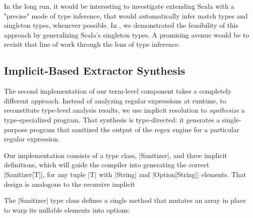 In the long run, it would be interesting to investigate extending Scala with a "precise" mode of type inference, that would automatically infer match types and singleton types, whenever possible.
In , we demonstrated the feasibility of this approach by generalizing Scala's singleton types.
A promising avenue would be to revisit that line of work through the lens of type inference.

\subsection{Implicit-Based Extractor Synthesis}
\label{subsec:implicit-based-extractor-synthesis}

The second implementation of our term-level component takes a completely different approach.
Instead of analyzing regular expressions at runtime, to reconstitute type-level analysis results, we use implicit resolution to \emph{synthesize} a type-specialized program.
That synthesis is type-directed: it generates a single-purpose program that sanitized the output of the regex engine for a particular regular expression.

Our implementation consists of a type class, |Sanitizer|, and three implicit definitions, which will guide the compiler into generating the correct |Sanitizer[T]|, for any tuple |T| with |String| and |Option[String]| elements.
That design is analogous to the recursive implicit

The |Sanitizer| type class defines a single method that mutates an array in place to warp its nullable elements into options:

\regexSanitizerTypeClass
%
%
%

